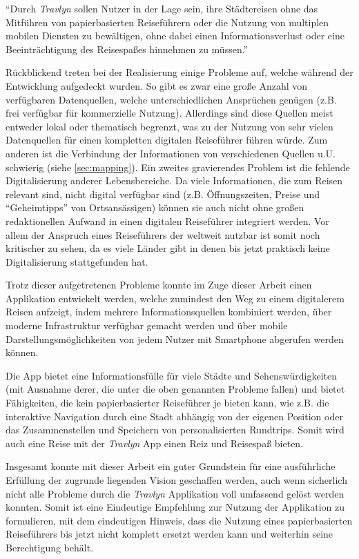 	\vspace{0.25cm}
	
	\enquote{Durch \textit{Travlyn} sollen Nutzer in der Lage sein, ihre Städtereisen ohne das Mitführen von papierbasierten Reiseführern oder die Nutzung von multiplen mobilen Diensten zu bewältigen, ohne dabei einen Informationsverlust oder eine Beeinträchtigung des Reisespaßes hinnehmen zu müssen.}
	
	\vspace{0.25cm}   
	
	Rückblickend treten bei der Realisierung einige Probleme auf, welche während der Entwicklung aufgedeckt wurden. So gibt es zwar eine große Anzahl von verfügbaren Datenquellen, welche unterschiedlichen Ansprüchen genügen (z.B. frei verfügbar für kommerzielle Nutzung). Allerdings sind diese Quellen meist entweder lokal oder thematisch begrenzt, was zu der Nutzung von sehr vielen Datenquellen für einen kompletten digitalen Reiseführer führen würde. Zum anderen ist die Verbindung der Informationen von verschiedenen Quellen u.U. schwierig (siehe \autoref{sec:mapping}).
	Ein zweites gravierendes Problem ist die fehlende Digitalisierung anderer Lebensbereiche. Da viele Informationen, die zum Reisen relevant sind, nicht digital verfügbar sind (z.B. Öffnungszeiten, Preise und \enquote{Geheimtipps} von Ortsansässigen) können sie auch nicht ohne großen redaktionellen Aufwand in einen digitalen Reiseführer integriert werden. Vor allem der Anspruch eines Reiseführers der weltweit nutzbar ist somit noch kritischer zu sehen, da es viele Länder gibt in denen bis jetzt praktisch keine Digitalisierung stattgefunden hat.
	
	\vspace{0.25cm}
	
	Trotz dieser aufgetretenen Probleme konnte im Zuge dieser Arbeit einen Applikation entwickelt werden, welche zumindest den Weg zu einem digitalerem Reisen aufzeigt, indem mehrere Informationsquellen kombiniert werden, über moderne Infrastruktur verfügbar gemacht werden und über mobile Darstellungsmöglichkeiten von jedem Nutzer mit Smartphone abgerufen werden können.
	
	Die App bietet eine Informationsfülle für viele Städte und Sehenswürdigkeiten (mit Ausnahme derer, die unter die oben genannten Probleme fallen) und bietet Fähigkeiten, die kein papierbasierter Reiseführer je bieten kann, wie z.B. die interaktive Navigation durch eine Stadt abhängig von der eigenen Position oder das Zusammenstellen und Speichern von personalisierten Rundtrips. Somit wird auch eine Reise mit der \textit{Travlyn} App einen Reiz und Reisespaß bieten.
	
	\vspace{0.25cm}
	
	Insgesamt konnte mit dieser Arbeit ein guter Grundstein für eine ausführliche Erfüllung der zugrunde liegenden Vision geschaffen werden, auch wenn sicherlich nicht alle Probleme durch die \textit{Travlyn} Applikation voll umfassend gelöst werden konnten. Somit ist eine Eindeutige Empfehlung zur Nutzung der Applikation zu formulieren,  mit dem eindeutigen Hinweis, dass die Nutzung eines papierbasierten Reiseführers bis jetzt nicht komplett ersetzt werden kann und weiterhin seine Berechtigung behält.